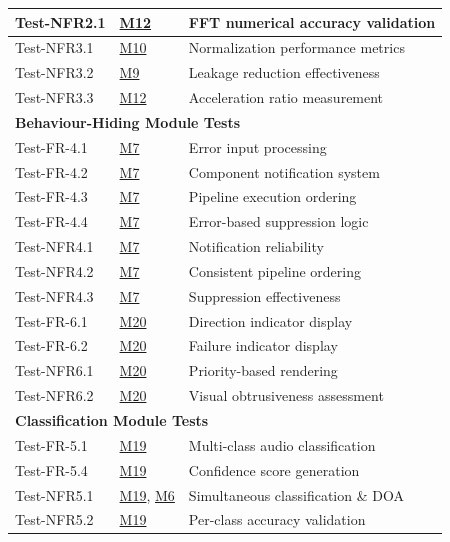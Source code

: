 \documentclass[12pt, titlepage]{article}
\begin{document}
{\begin{longtable}{|p{2.5cm}|p{3cm}|p{8cm}|}
\hline
Test-NFR2.1 & \hyperref[MG-mFFT]{M12} & FFT numerical accuracy validation \\
\hline
Test-NFR3.1 & \hyperref[MG-mAudioNormalizer]{M10} & Normalization performance
metrics \\
\hline
Test-NFR3.2 & \hyperref[MG-mAudioSpectralLeakage]{M9} & Leakage reduction
effectiveness \\
\hline
Test-NFR3.3 & \hyperref[MG-mFFT]{M12} & Acceleration ratio measurement \\
\hline
\hline
\multicolumn{3}{|l|}{\textbf{Behaviour-Hiding Module Tests}} \\
\hline
Test-FR-4.1 & \hyperref[MG-mAudio360Engine]{M7} & Error input processing \\
\hline
Test-FR-4.2 & \hyperref[MG-mAudio360Engine]{M7} & Component notification system
\\
\hline
Test-FR-4.3 & \hyperref[MG-mAudio360Engine]{M7} & Pipeline execution ordering \\
\hline
Test-FR-4.4 & \hyperref[MG-mAudio360Engine]{M7} & Error-based suppression logic
\\
\hline
Test-NFR4.1 & \hyperref[MG-mAudio360Engine]{M7} & Notification reliability \\
\hline
Test-NFR4.2 & \hyperref[MG-mAudio360Engine]{M7} & Consistent pipeline ordering
\\
\hline
Test-NFR4.3 & \hyperref[MG-mAudio360Engine]{M7} & Suppression effectiveness \\
\hline
Test-FR-6.1 & \hyperref[MG-mVisualization]{M20} & Direction indicator display \\
\hline
Test-FR-6.2 & \hyperref[MG-mVisualization]{M20} & Failure indicator display \\
\hline
Test-NFR6.1 & \hyperref[MG-mVisualization]{M20} & Priority-based rendering \\
\hline
Test-NFR6.2 & \hyperref[MG-mVisualization]{M20} & Visual obtrusiveness
assessment \\
\hline
\hline
\multicolumn{3}{|l|}{\textbf{Classification Module Tests}} \\
\hline
Test-FR-5.1 & \hyperref[MG-mClassification]{M19} & Multi-class audio
classification \\
\hline
Test-FR-5.4 & \hyperref[MG-mClassification]{M19} & Confidence score generation\\
\hline
Test-NFR5.1 & \hyperref[MG-mClassification]{M19}, \hyperref[MG-mDOA]{M6} &
Simultaneous classification \& DOA \\
\hline
Test-NFR5.2 & \hyperref[MG-mClassification]{M19} & Per-class accuracy validation

\end{longtable}}
\end{document}
